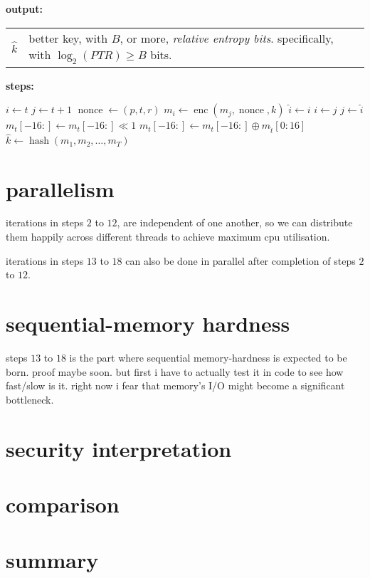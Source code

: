 \documentclass{article}
\DeclareMathOperator{\enc}{enc}
\DeclareMathOperator{\nonce}{nonce}
\DeclareMathOperator{\hash}{hash}
\begin{document}
\begin{multicols}{2}
\noindent\textbf{output:}

\begin{tabular}{lp{18em}}
$\hat k$ & better key, with $B$, or more, \emph{relative entropy bits}.
specifically, with $\log_2(PTR) \ge B$ bits.\\
\end{tabular}

\noindent\textbf{steps:}

\begin{algorithmic}[1]
            \STATE $i \gets t$
            \STATE $j \gets t+1$
                \STATE $\nonce \gets (p, t, r)$
                \STATE $m_i \gets \enc(m_j, \nonce, k)$
                \STATE $\hat i \gets i$
                \STATE $i \gets j$
                \STATE $j \gets \hat i$
            \ENDFOR
        \ENDFOR
                \STATE $m_t[-16:] \gets m_t[-16:] \ll 1$
                \STATE $m_t[-16:] \gets m_t[-16:] \oplus m_{\hat t}[0:16]$
            \ENDFOR
        \ENDFOR
    \ENDFOR
    \RETURN $\hat k \gets \hash(m_1, m_2, \ldots, m_T)$
\end{algorithmic}
\vfill\null
\columnbreak

\section{parallelism}
iterations in steps $2$ to $12$, are independent of one another, so we can
distribute them happily across different threads to achieve maximum cpu
utilisation.

iterations in steps $13$ to $18$ can also be done in parallel after
completion of steps $2$ to $12$.

\section{sequential-memory hardness}
steps $13$ to $18$ is the part where sequential memory-hardness is expected
to be born.  proof maybe soon.  but first i have to actually test it in
code to see how fast/slow is it.  right now i fear that memory's I/O might
become a significant bottleneck.
\vfill\null
\columnbreak

\section{security interpretation}
\section{comparison}
\section{summary}

\end{multicols}
\end{document}
